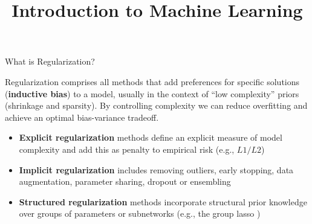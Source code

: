\documentclass[11pt,compress,t,notes=noshow, xcolor=table]{beamer}
\title{Introduction to Machine Learning}
\date{}
\begin{document}


\begin{vbframe}{What is Regularization?}

Regularization comprises all methods that add preferences for specific solutions (\textbf{inductive bias}) to a model, usually in the context of ``low complexity'' priors (shrinkage and sparsity). By controlling complexity we can reduce overfitting and achieve an optimal bias-variance tradeoff.
\vspace{0.1cm}
\begin{itemize}
\setlength{\itemsep}{1.0em}
    \item \textbf{Explicit regularization} methods define an explicit measure of model complexity and add this as penalty to empirical risk (e.g., $L1/L2$)
    \item \textbf{Implicit regularization} includes removing outliers, early stopping, data augmentation, parameter sharing, dropout or ensembling
    \item \textbf{Structured regularization} methods incorporate structural prior knowledge over groups of parameters or subnetworks (e.g., the group lasso )
\end{itemize}

\end{vbframe}
\end{document}
